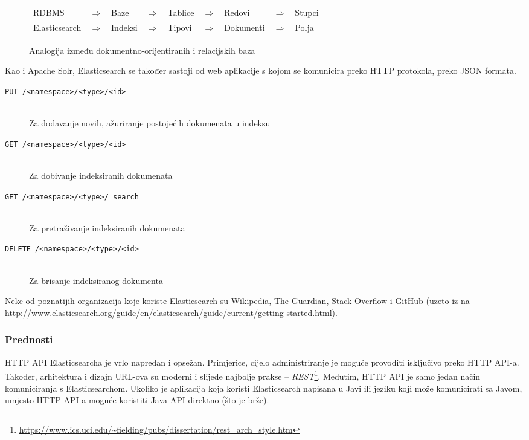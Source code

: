 \documentclass[a4paper,twoside,12pt]{scrreprt}
\begin{document}
\begin{figure}[H]
  \centering
  \begin{tabular}{lllllllll}
    RDBMS         & $\Rightarrow$ & Baze    & $\Rightarrow$ & Tablice & $\Rightarrow$ & Redovi    & $\Rightarrow$ & Stupci \\
    Elasticsearch & $\Rightarrow$ & Indeksi & $\Rightarrow$ & Tipovi  & $\Rightarrow$ & Dokumenti & $\Rightarrow$ & Polja  \\
  \end{tabular}
  \caption{Analogija između dokumentno-orijentiranih i relacijskih baza}
  \label{elasticsearch}
\end{figure}

Kao i Apache Solr, Elasticsearch se također sastoji od web aplikacije s kojom se komunicira preko HTTP protokola, preko JSON formata.

\begin{description}
  \item[\texttt{PUT /<namespace>/<type>/<id>}] \hfill \\ Za dodavanje novih, ažuriranje postojećih dokumenata u indeksu
  \item[\texttt{GET /<namespace>/<type>/<id>}] \hfill \\ Za dobivanje indeksiranih dokumenata
  \item[\texttt{GET /<namespace>/<type>/\_search}] \hfill \\ Za pretraživanje indeksiranih dokumenata
  \item[\texttt{DELETE /<namespace>/<type>/<id>}] \hfill \\ Za brisanje indeksiranog dokumenta
\end{description}

Neke od poznatijih organizacija koje koriste Elasticsearch su Wikipedia, The Guardian, Stack Overflow i GitHub (uzeto iz \cite{elasticguide} na \url{http://www.elasticsearch.org/guide/en/elasticsearch/guide/current/getting-started.html}).

\subsubsection{Prednosti}

HTTP API Elasticsearcha je vrlo napredan i opsežan. Primjerice, cijelo administriranje je moguće provoditi isključivo preko HTTP API-a. Također, arhitektura i dizajn URL-ova su moderni i slijede najbolje prakse – \textit{REST}\footnote{\url{https://www.ics.uci.edu/~fielding/pubs/dissertation/rest_arch_style.htm}}. Međutim, HTTP API je samo jedan način komuniciranja s Elasticsearchom. Ukoliko je aplikacija koja koristi Elasticsearch napisana u Javi ili jeziku koji može komunicirati sa Javom, umjesto HTTP API-a moguće koristiti Java API direktno (što je brže).
\end{document}
